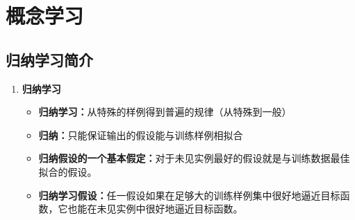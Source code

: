 \documentclass[../main.tex]{subfiles}
\begin{document}
\section{概念学习}\label{sec:concept-learning}

\subsection{归纳学习简介}
\begin{enumerate}
 \item \textbf{归纳学习}
    \begin{itemize}
        \item \textbf{归纳学习：}从特殊的样例得到普遍的规律（从特殊到一般）
        \item \textbf{归纳：}只能保证输出的假设能与训练样例相拟合
        \item \textbf{归纳假设的一个基本假定：}对于未见实例最好的假设就是与训练数据最佳拟合的假设。
        \item \textbf{归纳学习假设：}任一假设如果在足够大的训练样例集中很好地逼近目标函数，它也能在未见实例中很好地逼近目标函数。
    \end{itemize}
\end{enumerate}
\end{document}
